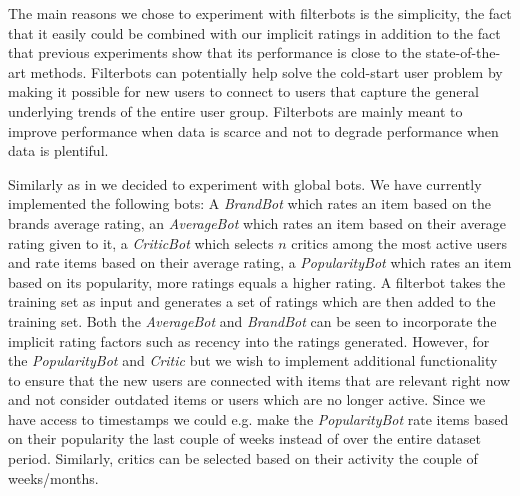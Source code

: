 The main reasons we chose to experiment with filterbots is the simplicity, the fact that it easily could
be combined with our implicit ratings in addition to the fact that previous experiments \cite{Agarwal2009, Agarwal2010} show that its performance is close to the state-of-the-art methods. Filterbots can potentially help solve the cold-start user problem by making it possible for new users to connect to users that capture the general underlying trends of the entire user group. Filterbots are mainly meant to improve performance when data is scarce and not to degrade performance when data is plentiful.

Similarly as in \cite{Park2006} we decided to experiment with global bots. We have currently implemented the following bots:
A \emph{BrandBot} which rates an item based on the brands average rating, an \emph{AverageBot} which rates an item based on their average rating given to it, a \emph{CriticBot} which selects $n$ critics among the most active users and rate items based on their average rating, a \emph{PopularityBot} which rates an item based on its popularity, more ratings equals a higher rating. A filterbot takes the training set as input and generates a set of ratings which are then added to the training set. Both the \emph{AverageBot} and \emph{BrandBot} can be seen to incorporate the implicit rating factors such as recency into the ratings generated. However, for the \emph{PopularityBot} and \emph{Critic} but we wish to implement additional functionality to ensure that the new users are connected with items that are relevant right now and not consider outdated items or users which are no longer active. Since we have access to timestamps we could e.g. make the \emph{PopularityBot} rate items based on their popularity the last couple of weeks instead of over the entire dataset period. Similarly, critics can be selected based on their activity the couple of weeks/months.


